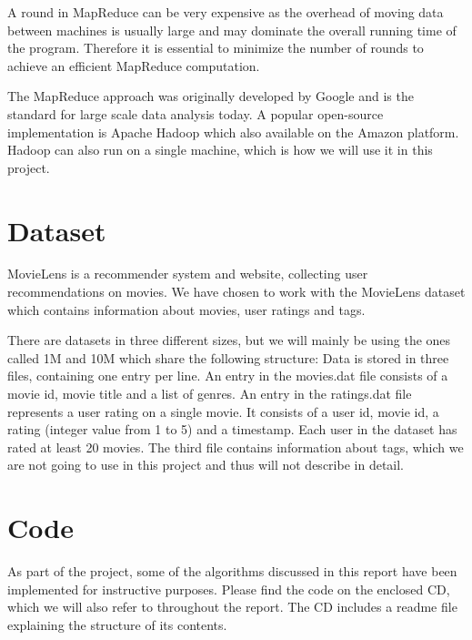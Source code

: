A round in MapReduce can be very expensive as the overhead of moving data between machines is usually large and may dominate the overall running time of the program. Therefore it is essential to minimize the number of rounds to achieve an efficient MapReduce computation.

The MapReduce approach was originally developed by Google and is the standard for large scale data analysis today. A popular open-source implementation is Apache Hadoop which also available on the Amazon platform. Hadoop can also run on a single machine, which is how we will use it in this project.



\section{Dataset}
MovieLens is a recommender system and website\cite{movielens}, collecting user recommendations on movies. We have chosen to work with the MovieLens dataset\cite{grouplens} which contains information about movies, user ratings and tags.

There are datasets in three different sizes, but we will mainly be using the ones called 1M and 10M which share the following structure: Data is stored in three files, containing one entry per line. An entry in the movies.dat file consists of a movie id, movie title and a list of genres. An entry in the ratings.dat file represents a user rating on a single movie. It consists of a user id, movie id, a rating (integer value from 1 to 5) and a timestamp. Each user in the dataset has rated at least 20 movies. The third file contains information about tags, which we are not going to use in this project and thus will not describe in detail.

\section{Code}
As part of the project, some of the algorithms discussed in this report have been implemented for instructive purposes. Please find the code on the enclosed CD, which we will also refer to throughout the report. The CD includes a readme file explaining the structure of its contents. 

